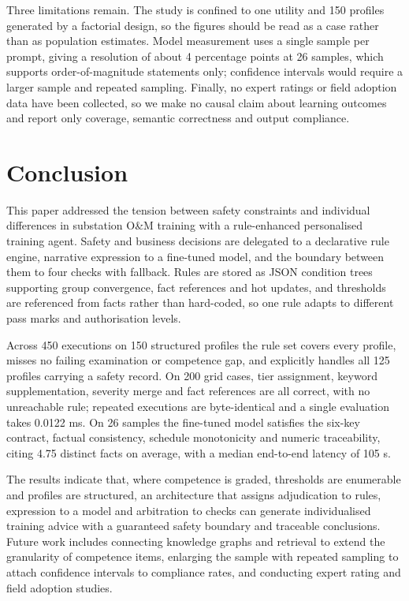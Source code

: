 \documentclass[conference]{IEEEtran}
\begin{document}
Three limitations remain. The study is confined to one utility and 150 profiles generated by a factorial design, so the figures should be read as a case rather than as population estimates. Model measurement uses a single sample per prompt, giving a resolution of about 4 percentage points at 26 samples, which supports order-of-magnitude statements only; confidence intervals would require a larger sample and repeated sampling. Finally, no expert ratings or field adoption data have been collected, so we make no causal claim about learning outcomes and report only coverage, semantic correctness and output compliance.


\section{Conclusion}

This paper addressed the tension between safety constraints and individual differences in substation O\&M training with a rule-enhanced personalised training agent. Safety and business decisions are delegated to a declarative rule engine, narrative expression to a fine-tuned model, and the boundary between them to four checks with fallback. Rules are stored as JSON condition trees supporting group convergence, fact references and hot updates, and thresholds are referenced from facts rather than hard-coded, so one rule adapts to different pass marks and authorisation levels.


Across 450 executions on 150 structured profiles the rule set covers every profile, misses no failing examination or competence gap, and explicitly handles all 125 profiles carrying a safety record. On 200 grid cases, tier assignment, keyword supplementation, severity merge and fact references are all correct, with no unreachable rule; repeated executions are byte-identical and a single evaluation takes 0.0122 ms. On 26 samples the fine-tuned model satisfies the six-key contract, factual consistency, schedule monotonicity and numeric traceability, citing 4.75 distinct facts on average, with a median end-to-end latency of 105 s.


The results indicate that, where competence is graded, thresholds are enumerable and profiles are structured, an architecture that assigns adjudication to rules, expression to a model and arbitration to checks can generate individualised training advice with a guaranteed safety boundary and traceable conclusions. Future work includes connecting knowledge graphs and retrieval to extend the granularity of competence items, enlarging the sample with repeated sampling to attach confidence intervals to compliance rates, and conducting expert rating and field adoption studies.
\end{document}
